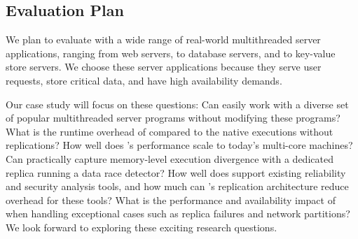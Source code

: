 \subsection{Evaluation Plan} \label{sec:rep-eval}
We plan to evaluate \crane with a wide range of real-world multithreaded server
applications, ranging from web servers, to database servers, and to key-value
store servers. We choose these server applications because they serve user
requests, store critical data, and have high availability demands.

Our case study will focus on these questions: Can \crane easily work with a
diverse set of popular multithreaded server programs without modifying these
programs? What is the runtime overhead of \crane compared to the native
executions without replications? How well does \crane's performance scale to
today's multi-core machines? Can \crane practically capture memory-level
execution divergence with a dedicated replica running a data race detector? How
well does \crane support existing reliability and security analysis tools, and
how much can \crane's replication architecture reduce overhead for these tools?
What is the performance and availability impact of \crane when handling
exceptional cases such as replica failures and network partitions? We look
forward to exploring these exciting research questions.



